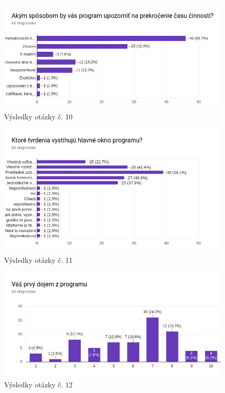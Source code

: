 \documentclass[]{article}
\begin{document}
\begin{figure}[h!]
	\includegraphics[width=\textwidth]{otazka10}
	\caption{Výsledky otázky č. 10}
\end{figure}

\begin{figure}[h!]
	\includegraphics[width=\textwidth]{otazka11}
	\caption{Výsledky otázky č. 11}
\end{figure}

\begin{figure}[h!]
	\includegraphics[width=\textwidth]{otazka12}
	\caption{Výsledky otázky č. 12}
\end{figure}
\end{document}
